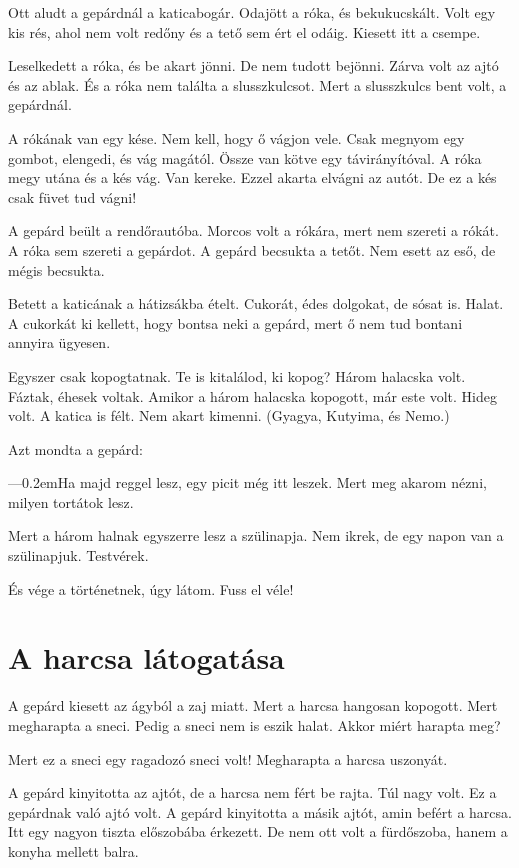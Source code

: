 \documentclass[12pt]{memoir}
\def\dash{---\kern 0.2em}
\begin{document}
Ott aludt a gepárdnál a katicabogár. Odajött a róka, és bekukucskált. Volt egy
kis rés, ahol nem volt redőny és a tető sem ért el odáig. Kiesett itt a csempe.

Leselkedett a róka, és be akart jönni. De nem tudott bejönni. Zárva volt az
ajtó és az ablak. És a róka nem találta a slusszkulcsot. Mert a slusszkulcs
bent volt, a gepárdnál.

A rókának van egy kése. Nem kell, hogy ő vágjon vele. Csak megnyom egy gombot,
elengedi, és vág magától. Össze van kötve egy távirányítóval. A róka megy utána
és a kés vág. Van kereke. Ezzel akarta elvágni az autót. De ez a kés csak füvet
tud vágni!

\bigskip

A gepárd beült a rendőrautóba. Morcos volt a rókára, mert nem szereti a rókát.
A róka sem szereti a gepárdot. A gepárd becsukta a tetőt. Nem esett az eső, de
mégis becsukta.

Betett a katicának a hátizsákba ételt. Cukorát, édes dolgokat, de sósat is.
Halat. A cukorkát ki kellett, hogy bontsa neki a gepárd, mert ő nem tud bontani
annyira ügyesen.

Egyszer csak kopogtatnak. Te is kitalálod, ki kopog? Három halacska volt.
Fáztak, éhesek voltak. Amikor a három halacska kopogott, már este volt. Hideg
volt. A katica is félt. Nem akart kimenni. (Gyagya, Kutyima, és Nemo.)

Azt mondta a gepárd:

\dash Ha majd reggel lesz, egy picit még itt leszek. Mert meg akarom nézni,
milyen tortátok lesz.

Mert a három halnak egyszerre lesz a szülinapja. Nem ikrek, de egy napon van a
szülinapjuk.  Testvérek.

És vége a történetnek, úgy látom. Fuss el véle!


\section*{A harcsa látogatása}
A gepárd kiesett az ágyból a zaj miatt. Mert a harcsa hangosan kopogott. Mert
megharapta a sneci. Pedig a sneci nem is eszik halat. Akkor miért harapta meg?

Mert ez a sneci egy ragadozó sneci volt! Megharapta a harcsa uszonyát.

A gepárd kinyitotta az ajtót, de a harcsa nem fért be rajta. Túl nagy volt. Ez
a gepárdnak való ajtó volt. A gepárd kinyitotta a másik ajtót, amin befért a
harcsa. Itt egy nagyon tiszta előszobába érkezett. De nem ott volt a
fürdőszoba, hanem a konyha mellett balra.
\end{document}
